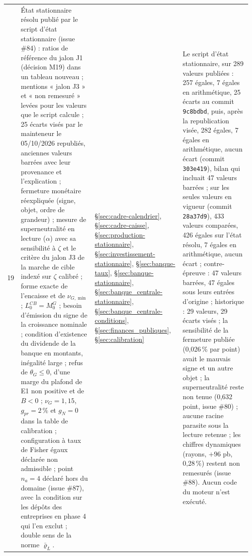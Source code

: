 \documentclass[11pt,a4paper]{article}
\begin{document}
\begin{center}
\begin{longtable}{p{0.5cm}>{\raggedright\arraybackslash}p{6.3cm}>{\raggedright\arraybackslash}p{2.1cm}>{\raggedright\arraybackslash}p{5.8cm}}
19 & État stationnaire résolu publié par le script d'état stationnaire (issue \#84) : ratios de référence du jalon J1 (décision M19) dans un tableau nouveau ; mentions « jalon J3 » et « non remesuré » levées pour les valeurs que le script calcule ; 25 écarts visés par le mainteneur le 05/10/2026 republiés, anciennes valeurs barrées avec leur provenance et l'explication ; fermeture monétaire réexpliquée (signe, objet, ordre de grandeur) ; mesure de superneutralité en lecture ($\alpha$) avec sa sensibilité à $\zeta$ et le critère du jalon J3 de la marche de cible indexé sur $\zeta$ calibré ; forme exacte de l'encaisse et de $\nu_{G,\min}$ ; $L^{\mathit{CB}}_0 = M^G_0$ ; besoin d'émission du signe de la croissance nominale ; condition d'existence du dividende de la banque en montants, inégalité large ; refus de $\theta_G \le 0$, d'une marge du plafond de E1 non positive et de $B < 0$ ; $\nu_G = 1{,}15$, $g_{\mathit{pr}} = 2\,\%$ et $g_N = 0$ dans la table de calibration ; configuration à taux de Fisher égaux déclarée non admissible ; point $n_a = 4$ déclaré hors du domaine (issue \#87), avec la condition sur les dépôts des entreprises en phase 4 qui l'en exclut ; double sens de la norme $\bar\varrho_L$. & \S\ref{sec:cadre-calendrier}, \S\ref{sec:cadre-caisse}, \S\ref{sec:production-stationnaire}, \S\ref{sec:investissement-stationnaire}, \S\ref{sec:banque-taux}, \S\ref{sec:banque-stationnaire}, \S\ref{sec:banque_centrale-stationnaire}, \S\ref{sec:banque_centrale-conditions}, \S\ref{sec:finances_publiques}, \S\ref{sec:calibration} & Le script d'état stationnaire, sur 289 valeurs publiées : 257 égales, 7 égales en arithmétique, 25 écarts au commit \texttt{9c8bdbd}, puis, après la republication visée, 282 égales, 7 égales en arithmétique, aucun écart (commit \texttt{303e419}), bilan qui incluait 47 valeurs barrées ; sur les seules valeurs en vigueur (commit \texttt{28a37d9}), 433 valeurs comparées, 426 égales sur l'état résolu, 7 égales en arithmétique, aucun écart ; contre-épreuve : 47 valeurs barrées, 47 égales sous leurs entrées d'origine ; historique : 29 valeurs, 29 écarts visés ; la sensibilité de la fermeture publiée (0,026\,\% par point) avait le mauvais signe et un autre objet ; la superneutralité reste non tenue (0,632 point, issue \#80) ; aucune racine parasite sous la lecture retenue ; les chiffres dynamiques (rayons, $+96$ pb, 0,28\,\%) restent non remesurés (issue \#88). Aucun code du moteur n'est exécuté.\\

\end{longtable}
\end{center}
\end{document}
